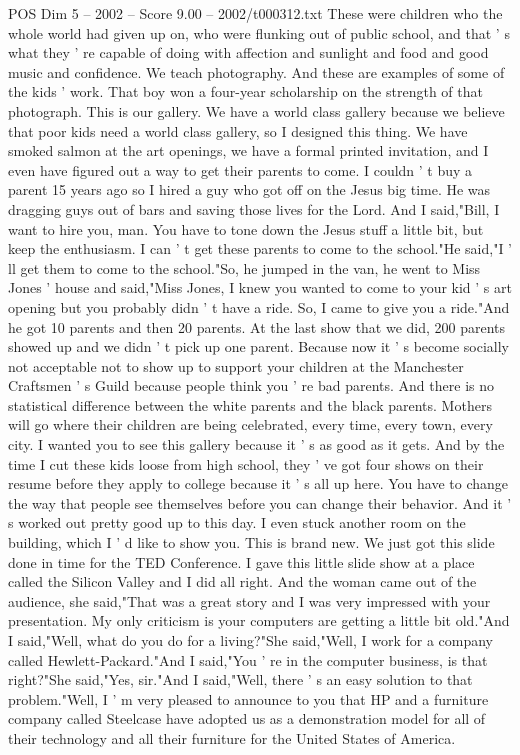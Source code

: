 \begin{textsample}{POS Dim 5 – 2002 – Score 9.00 – 2002/t000312.txt}
These were children who the whole world had given up on, who were flunking out of public school, and that ' s what they ' re capable of doing with affection and sunlight and food and good music and confidence.
We teach photography.
And these are examples of some of the kids ' work.
That boy won a four-year scholarship on the strength of that photograph.
This is our gallery.
We have a world class gallery because we believe that poor kids need a world class gallery, so I designed this thing.
We have smoked salmon at the art openings, we have a formal printed invitation, and I even have figured out a way to get their parents to come.
I couldn ' t buy a parent 15 years ago so I hired a guy who got off on the Jesus big time.
He was dragging guys out of bars and saving those lives for the Lord.
And I said,"Bill, I want to hire you, man.
You have to tone down the Jesus stuff a little bit, but keep the enthusiasm.
I can ' t get these parents to come to the school."He said,"I ' ll get them to come to the school."So, he jumped in the van, he went to Miss Jones ' house and said,"Miss Jones, I knew you wanted to come to your kid ' s art opening but you probably didn ' t have a ride.
So, I came to give you a ride."And he got 10 parents and then 20 parents.
At the last show that we did, 200 parents showed up and we didn ' t pick up one parent.
Because now it ' s become socially not acceptable not to show up to support your children at the Manchester Craftsmen ' s Guild because people think you ' re bad parents.
And there is no statistical difference between the white parents and the black parents.
Mothers will go where their children are being celebrated, every time, every town, every city.
I wanted you to see this gallery because it ' s as good as it gets.
And by the time I cut these kids loose from high school, they ' ve got four shows on their resume before they apply to college because it ' s all up here.
You have to change the way that people see themselves before you can change their behavior.
And it ' s worked out pretty good up to this day.
I even stuck another room on the building, which I ' d like to show you.
This is brand new.
We just got this slide done in time for the TED Conference.
I gave this little slide show at a place called the Silicon Valley and I did all right.
And the woman came out of the audience, she said,"That was a great story and I was very impressed with your presentation.
My only criticism is your computers are getting a little bit old."And I said,"Well, what do you do for a living?"She said,"Well, I work for a company called Hewlett-Packard."And I said,"You ' re in the computer business, is that right?"She said,"Yes, sir."And I said,"Well, there ' s an easy solution to that problem."Well, I ' m very pleased to announce to you that HP and a furniture company called Steelcase have adopted us as a demonstration model for all of their technology and all their furniture for the United States of America.

\end{textsample}
